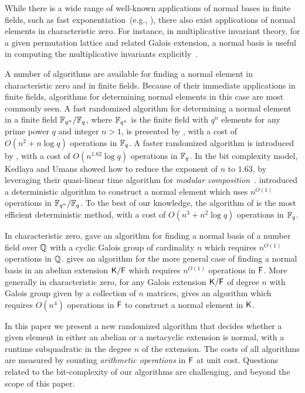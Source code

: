While there is a wide range of well-known applications of normal bases in
finite fields, such as fast exponentiation~(e.g., \citealt{GaGaPaSh00}), there also
exist applications of normal elements in characteristic zero.  For instance,
in multiplicative invariant theory, for a given permutation lattice and
related Galois extension, a normal basis is useful in computing the
multiplicative invariants explicitly~\citep*{Jam18}.

A number of algorithms are available for finding a normal element in
characteristic zero and in finite fields.  Because of their immediate
applications in finite fields, algorithms for determining normal
elements in this case are most commonly seen.  A fast randomized
algorithm for determining a normal element in a finite field
${\mathbb{F}}_{q^n}/{\mathbb{F}}_q$, where ${\mathbb{F}}_{q^n}$ is the finite field with $q^n$
elements for any prime power $q$ and integer $n>1$, is presented by
, with a cost of $O(n^2+n\log q)$ operations in
${\mathbb{F}}_q$.  A faster randomized algorithm is introduced by
, with a cost of $O(n^{1.82}\log q)$ operations in
${\mathbb{F}}_q$.  In the bit complexity model, Kedlaya and Umans showed how to
reduce the exponent of $n$ to $1.63$, by leveraging their quasi-linear
time algorithm for {\em modular
  composition}~\citep{KeUm11}. \cite{LenstraNormal} introduced a
deterministic algorithm to construct a normal element which uses
$n^{O(1)}$ operations in ${\mathbb{F}}_{q^n}/{\mathbb{F}}_q$.  To the best of our
knowledge, the algorithm of \cite{AugCam94} is the most efficient
deterministic method, with a cost of $O(n^3+n^2\log q)$ operations in
${\mathbb{F}}_q$.

In characteristic zero, \cite{SchSte93} gave an algorithm for finding
a normal basis of a number field over $\mathbb{Q}$ with a cyclic Galois group
of cardinality $n$ which requires $n^{O(1)}$ operations in $\mathbb{Q}$.
\cite{Pol94} gives an algorithm for the more general case of finding a
normal basis in an abelian extension ${\mathsf{K}}/{\mathsf{F}}$ which requires $n^{O(1)}$
operations in ${\mathsf{F}}$.  More generally in characteristic zero, for any
Galois extension ${\mathsf{K}}/{\mathsf{F}}$ of degree $n$ with Galois group given by a
collection of $n$ matrices, \cite{Girstmair} gives an algorithm which
requires $O(n^4)$ operations in ${\mathsf{F}}$ to construct a normal element in
${\mathsf{K}}$.

In this paper we present a new randomized algorithm that decides
whether a given element in either an abelian or a metacyclic extension
is normal, with a runtime subquadratic in the degree $n$ of the
extension. The costs of all algorithms are measured by counting
\emph{arithmetic operations} in ${\mathsf{F}}$ at unit cost.  Questions related
to the bit-complexity of our algorithms are challenging, and beyond
the scope of this paper.

